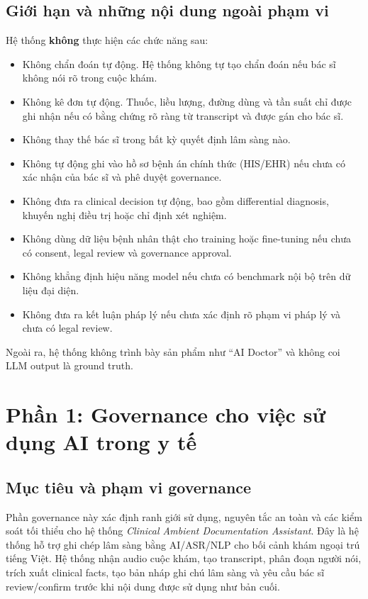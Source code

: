 \documentclass[12pt,a4paper]{article}
\begin{document}
\subsection{Giới hạn và những nội dung ngoài phạm vi}

Hệ thống \textbf{không} thực hiện các chức năng sau:

\begin{itemize}
    \item Không chẩn đoán tự động. Hệ thống không tự tạo chẩn đoán nếu bác sĩ không nói rõ trong cuộc khám.
    \item Không kê đơn tự động. Thuốc, liều lượng, đường dùng và tần suất chỉ được ghi nhận nếu có bằng chứng rõ ràng từ transcript và được gán cho bác sĩ.
    \item Không thay thế bác sĩ trong bất kỳ quyết định lâm sàng nào.
    \item Không tự động ghi vào hồ sơ bệnh án chính thức (HIS/EHR) nếu chưa có xác nhận của bác sĩ và phê duyệt governance.
    \item Không đưa ra clinical decision tự động, bao gồm differential diagnosis, khuyến nghị điều trị hoặc chỉ định xét nghiệm.
    \item Không dùng dữ liệu bệnh nhân thật cho training hoặc fine-tuning nếu chưa có consent, legal review và governance approval.
    \item Không khẳng định hiệu năng model nếu chưa có benchmark nội bộ trên dữ liệu đại diện.
    \item Không đưa ra kết luận pháp lý nếu chưa xác định rõ phạm vi pháp lý và chưa có legal review.
\end{itemize}

Ngoài ra, hệ thống không trình bày sản phẩm như ``AI Doctor'' và không coi LLM output là ground truth.

\section{Phần 1: Governance cho việc sử dụng AI trong y tế}

\subsection{Mục tiêu và phạm vi governance}

Phần governance này xác định ranh giới sử dụng, nguyên tắc an toàn và các kiểm soát tối thiểu cho hệ thống \textit{Clinical Ambient Documentation Assistant}. Đây là hệ thống hỗ trợ ghi chép lâm sàng bằng AI/ASR/NLP cho bối cảnh khám ngoại trú tiếng Việt. Hệ thống nhận audio cuộc khám, tạo transcript, phân đoạn người nói, trích xuất clinical facts, tạo bản nháp ghi chú lâm sàng và yêu cầu bác sĩ review/confirm trước khi nội dung được sử dụng như bản cuối.
\end{document}
